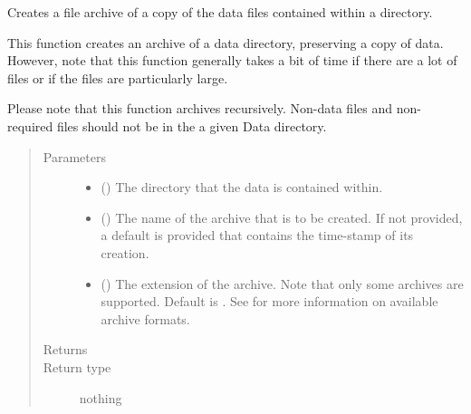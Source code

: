 \documentclass[letterpaper,10pt,english]{sphinxmanual}
\begin{document}
\begin{fulllineitems}
\label{\detokenize{python_docstrings/IfA_Smeargle.bravo.archiving:IfA_Smeargle.bravo.archiving.bravo_archive_data_duplicates}}
Creates a file archive of a copy of the data files contained within a
directory.

This function creates an archive of a data directory, preserving a copy
of data. However, note that this function generally takes a bit of time
if there are a lot of files or if the files are particularly large.

Please note that this function archives recursively. Non-data files and
non-required files should not be in the a given Data directory.
\begin{quote}\begin{description}
\item[{Parameters}] \leavevmode\begin{itemize}
\item {} 
 () \textendash{} The directory that the data is contained within.

\item {} 
 (\sphinxstyleliteralemphasis{\sphinxupquote{ (}}\sphinxstyleliteralemphasis{\sphinxupquote{)}}) \textendash{} The name of the archive that is to be created. If not provided, a
default is provided that contains the time-stamp of its creation.

\item {} 
 (\sphinxstyleliteralemphasis{\sphinxupquote{ (}}\sphinxstyleliteralemphasis{\sphinxupquote{)}}) \textendash{} The extension of the archive. Note that only some archives are
supported. Default is . See
 for more information on
available archive formats.

\end{itemize}

\item[{Returns}] \leavevmode


\item[{Return type}] \leavevmode
nothing

\end{description}\end{quote}

\end{fulllineitems}
\end{document}
